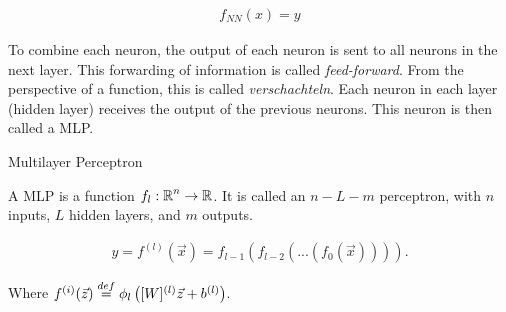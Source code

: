 \begin{align}
	f_{NN}(x) = y
\end{align} 

To combine each neuron, the output of each neuron is sent to all neurons in the next layer. This forwarding of information is called \textit{feed-forward}. From the perspective of a function, this is called \textit{verschachteln}. Each neuron in each layer (hidden layer) receives the output of the previous neurons. This neuron is then called a \gls{MLP}.

\begin{Definition}{Multilayer Perceptron}
	
	A \gls{MLP} is a function $f_l:\operatorname*{\mathbb{R}}^n \rightarrow \operatorname*{\mathbb{R}}$. It is called an $n-L-m$ perceptron, with $n$ inputs, $L$ hidden layers, and $m$ outputs.
	
	\begin{align}
		y = f^{(l)}(\vec{x}) = f_{l-1}\left(f_{l-2}\left(...\left(f_{0}(\vec{x})\right)\right)\right).
	\end{align}
	
	Where $f^{(i)}(\vec{z}) \stackrel{def}{=} \phi_l\left( \mathbf{[}W]^{(l)}\vec{z} + b^{(l)}\right)$.
\end{Definition}


